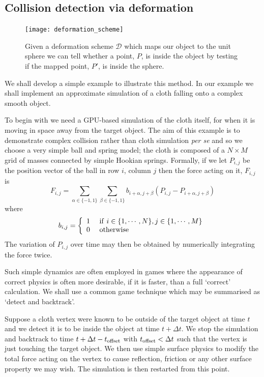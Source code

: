 \subsection{Collision detection via deformation}

\begin{figure}
\centering
\texttt{[image: deformation\_scheme]}
\caption{\label{fig:deformation_scheme}Given a deformation scheme $\mathcal{D}$ which maps
  our object to the unit sphere we can tell whether a point, $P$, is inside the object by
          testing if the mapped point, $P'$, is inside the sphere.}
\end{figure}

We shall develop a simple example to illustrate this method. In our example we
shall implement an approximate simulation of a cloth falling onto a complex
smooth object. 

To begin with we need a GPU-based simulation of the cloth itself, for when
it is moving in space away from the target object. The aim of this example is
to demonstrate complex collision rather than cloth simulation \emph{per se}
and so we choose a very simple ball and spring model; the cloth is composed
of a $N\times M$ grid of masses connected by simple Hookian springs. Formally, 
if we let $P_{i,j}$
be the position vector of the ball in row $i$, column $j$ then the force acting
on it, $F_{i,j}$ is
\[
F_{i,j} = \sum_{\alpha \in \{-1,1\}} \sum_{\beta \in \{-1,1\}} 
b_{i+\alpha, j+\beta} 
(P_{i,j} - P_{i+\alpha, j+\beta})
\]
where
\[
b_{i,j} = 
\left\{
\begin{array}{ll}
1 & {\rm ~if~} i \in \{1, \cdots, N\}, j \in \{1, \cdots, M\} \\
0 & {\rm ~otherwise}
\end{array}
\right.
\]
The variation of $P_{i,j}$ over time may then be obtained by numerically
integrating the force twice.

Such simple dynamics are often employed in games where the appearance of
correct physics is often more desirable, if it is faster, than a full
`correct' calculation. We shall use a common game technique
which may be summarised as `detect and backtrack'.

Suppose a cloth vertex were known to be outside of the target object at time
$t$ and we detect it is to be inside the object at time $t + \Delta t$. 
We stop the simulation and backtrack to time $t + \Delta t - t_{\rm offset}$
with $t_{\rm offset} < \Delta t$ such that the vertex is just touching
the target object. We then use simple surface physics to modify the total
force acting on the vertex to cause reflection, friction or any other 
surface property we may wish. The simulation is then restarted from this point.

